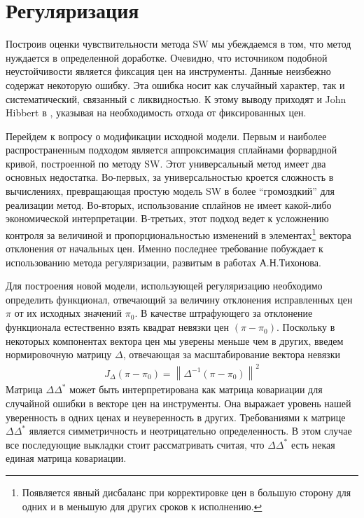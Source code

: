 \documentclass[10pt]{article}
\theoremstyle{definition}
\theoremstyle{remark}
\theoremstyle{plain}
\begin{document}
\newpage
\section{Регуляризация}
Построив оценки чувствительности метода SW мы убеждаемся в том, что метод нуждается в определенной доработке. Очевидно, что источником подобной неустойчивости является фиксация цен на инструменты. Данные неизбежно содержат некоторую ошибку. Эта ошибка носит как случайный характер, так и систематический, связанный с ликвидностью. К этому выводу приходят и John Hibbert в \cite{Hibbert}, указывая на необходимость отхода от фиксированных цен. 

Перейдем к вопросу о модификации исходной модели. Первым и наиболее распространенным подходом является аппроксимация сплайнами форвардной кривой, построенной по методу SW. Этот универсальный метод имеет два основных недостатка. Во-первых, за универсальностью кроется сложность в вычислениях, превращающая простую модель  SW в более ``громоздкий'' для реализации метод. Во-вторых, использование сплайнов не имеет какой-либо экономической интерпретации. В-третьих, этот подход ведет к усложнению контроля за величиной и пропорциональностью изменений в элементах\footnote{Появляется явный дисбаланс при корректировке цен в большую сторону для одних и в меньшую для других сроков к исполнению.} вектора отклонения от начальных цен. Именно последнее требование побуждает к использованию метода регуляризации, развитым в работах А.Н.Тихонова. 

Для построения новой модели, использующей регуляризацию необходимо определить функционал, отвечающий за величину отклонения исправленных цен $\pi$ от их исходных значений $\pi_0$. В качестве штрафующего за отклонение функционала естественно взять квадрат невязки цен $(\pi - \pi_0)$. Поскольку в некоторых компонентах вектора цен мы уверены меньше чем в других, введем нормировочную матрицу $\Delta$, отвечающая за масштабирование вектора невязки
\begin{align*}
J_{\Delta}(\pi-\pi_0) = \left\|\Delta^{-1}(\pi - \pi_0)\right\|^2 
\end{align*}
 Матрица $\Delta\Delta^*$ может быть интерпретирована как матрица ковариации для случайной ошибки в векторе цен на инструменты. Она выражает уровень нашей уверенность в одних ценах и неуверенность в других. Требованиями к матрице $\Delta\Delta^*$ является симметричность и неотрицательно определенность. В этом случае все последующие выкладки стоит рассматривать считая, что $\Delta\Delta^*$ есть некая единая матрица ковариации.
 
\end{document}
